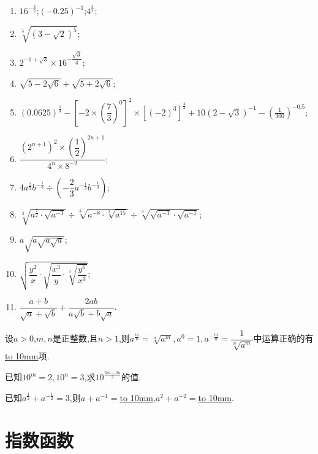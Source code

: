 \documentclass[lang=cn,math=cm,chinesefont=nofont,11pt,scheme=chinese,twocol]{elegantbook}
\begin{document}
\begin{spacing}{1.8}
  \begin{enumerate}
    \item $16^{-\frac{3}{2}}$;$\left(-0.25\right)^{-1}$;$4^{\frac32}$;
    \item $\sqrt[5]{(3-\sqrt{2})^5}$;
    \item $2^{-1+\sqrt{3}}\times16^{-\dfrac{\sqrt{3}}4}$;
    \item $\sqrt{5-2\sqrt6}+\sqrt{5+2\sqrt6}$;
    \item $(0.0625)^{\frac{1}{4}}-\left[-2\times\left(\dfrac{7}{3}\right)^{0}\right]^{2}\times\left[\left(-2\right)^{3}\right]^{\frac{4}{3}}+10\left(2-\sqrt{3}\right)^{-1}-\left(\frac{1}{300}\right)^{-0.5}$;
    \item $\dfrac{\left(2^{n+1}\right)^2\times\left(\dfrac{1}{2}\right)^{2n+1}}{4^n\times8^{-2}}$;
    \item $4a^{\frac{2}{3}}b^{-\frac{1}{3}}\div\left(-\dfrac{2}{3}a^{-\frac{1}{3}}b^{-\frac{1}{3}}\right)$;
    \item $\sqrt[3]{a^{\frac{7}{2}}\cdot\sqrt{a^{-3}}}\div\sqrt[3]{a^{-8}\cdot\sqrt[3]{a^{15}}}\div\sqrt[3]{\sqrt{a^{-3}}\cdot\sqrt{a^{-1}}}$;
    \item $a\sqrt{a\sqrt{a\sqrt{a}}}$;
    \item $\sqrt{\dfrac{y^{2}}{x}\cdot\sqrt{\dfrac{x^{3}}{y}\cdot\sqrt[3]{\dfrac{y^{6}}{x^{3}}}}}$;
    \item $\dfrac{a+b}{\sqrt{a}+\sqrt{b}}+\dfrac{2ab}{a\sqrt{b}+b\sqrt{a}}$.
  \end{enumerate}
\end{spacing}

\begin{exercise}\label{2017RJA_bx1_P109.2.2}
  设$a>0$,$m,n$是正整数,且$n>1$,则$a^{\frac{m}{n}}=\sqrt[n]{a^m} , a^0=1 , a^{-\frac{m}{n}}=\dfrac{1}{\sqrt[n]{a^m}}$中运算正确的有\underline{\hbox to 10mm{}}项.
\end{exercise}

\begin{exercise}\label{2017RJA_bx1_P110.7.1}
  已知$10^m=2,10^n=3$,求$10^{\frac{3m-2n}{2}}$的值.
\end{exercise}

\begin{exercise}
  已知$a^\frac12+a^{-\frac12}=3$,则$a+a^{-1}=$\underline{\hbox to 10mm{}},$a^{2}+a^{-2}=$\underline{\hbox to 10mm{}}.
\end{exercise}

\section{指数函数}
\end{document}
